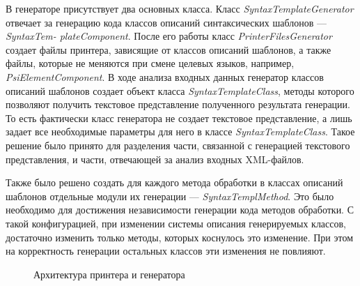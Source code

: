 \documentclass{matmex-diploma}
\begin{document}
В генераторе присутствует два основных класса. Класс \textit{SyntaxTemplateGenerator} отвечает за генерацию кода классов описаний синтаксических шаблонов ---  \textit{SyntaxTem- plateComponent}. После его работы класс \textit{PrinterFilesGenerator} создает файлы принтера, зависящие от классов описаний шаблонов, а также файлы, которые не меняются при смене целевых языков, например, \textit{PsiElementComponent}. В ходе анализа входных данных генератор классов описаний шаблонов создает объект класса \textit{SyntaxTemplateClass}, методы которого позволяют получить текстовое представление полученного результата генерации. То есть фактически класс генератора не создает текстовое представление, а лишь задает все необходимые параметры для него в классе \textit{SyntaxTemplateClass}. Такое решение было принято для разделения части, связанной с генерацией текстового представления, и части, отвечающей за анализ входных XML-файлов.

Также было решено создать для каждого метода обработки в классах описаний шаблонов отдельные модули их генерации --- \textit{SyntaxTemplMethod}. Это было необходимо для достижения независимости генерации кода методов обработки. С такой конфигурацией, при изменении системы описания генерируемых классов, достаточно изменить только методы, которых коснулось это изменение. При этом на корректность генерации остальных классов эти изменения не повлияют.

\begin{figure}[h]
\caption{Архитектура принтера и генератора}
\label{fig:Architecture}
\end{figure}
\end{document}
